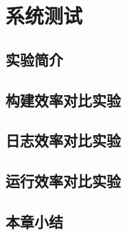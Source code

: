 \chapter{系统测试}  
\label{ch4}


\section{实验简介}
\section{构建效率对比实验}
\section{日志效率对比实验}
\section{运行效率对比实验}
 \section{本章小结}
